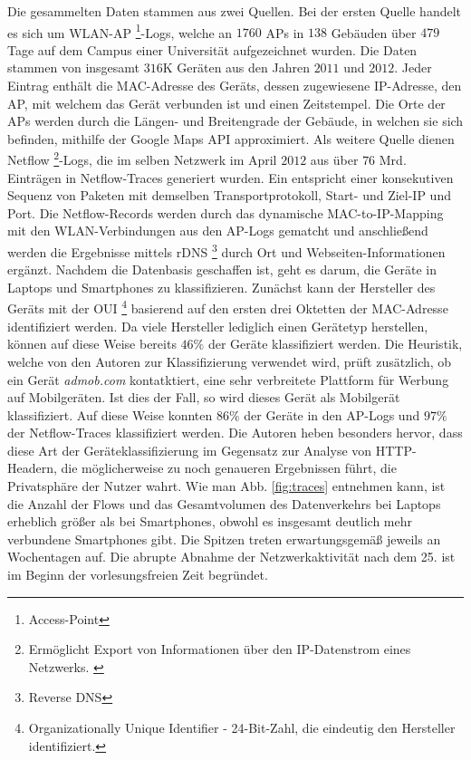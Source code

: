\documentclass[12pt, a4paper]{article}
\begin{document}
Die gesammelten Daten stammen aus zwei Quellen. Bei der ersten Quelle handelt es sich um WLAN-AP \footnote{Access-Point}-Logs,
welche an $1760$ APs in $138$ Gebäuden über $479$ Tage auf dem Campus einer Universität aufgezeichnet wurden. 
Die Daten stammen von insgesamt $316$\textsc{K} Geräten aus den Jahren $2011$ und $2012$. Jeder Eintrag enthält die 
MAC-Adresse des Geräts, dessen zugewiesene IP-Adresse, den AP, mit welchem das Gerät verbunden ist und einen Zeitstempel.
Die Orte der APs werden durch die Längen- und Breitengrade der Gebäude, in welchen sie sich befinden, mithilfe der Google Maps API
approximiert. Als weitere Quelle dienen Netflow \footnote{Ermöglicht Export von Informationen über den IP-Datenstrom eines 
Netzwerks. \cite{RFC3954}}-Logs, die im selben Netzwerk im April $2012$ aus über $76$ Mrd.
Einträgen in Netflow-Traces generiert wurden. Ein  entspricht einer konsekutiven Sequenz von Paketen
mit demselben Transportprotokoll, Start- und Ziel-IP und Port. \cite{Alipour2018}
Die Netflow-Records werden durch das dynamische MAC-to-IP-Mapping mit den WLAN-Verbindungen aus den AP-Logs gematcht
und anschließend werden die Ergebnisse mittels rDNS \footnote{Reverse DNS} durch Ort und Webseiten-Informationen
ergänzt. Nachdem die Datenbasis geschaffen ist, geht es darum, die Geräte in Laptops und Smartphones zu klassifizieren.
Zunächst kann der Hersteller des Geräts mit der OUI \footnote{Organizationally Unique Identifier - 24-Bit-Zahl, 
die eindeutig den Hersteller identifiziert.} basierend auf den ersten drei Oktetten der MAC-Adresse identifiziert werden.
Da viele Hersteller lediglich einen Gerätetyp herstellen, können auf diese Weise bereits
$46 \%$ der Geräte klassifiziert werden. Die Heuristik, welche von den Autoren zur Klassifizierung verwendet wird,
prüft zusätzlich, ob ein Gerät \textit{admob.com} kontatktiert, eine sehr verbreitete Plattform für Werbung auf Mobilgeräten.
Ist dies der Fall, so wird dieses Gerät als Mobilgerät klassifiziert. Auf diese Weise konnten $86 \%$ der Geräte in den AP-Logs
und $97 \%$ der Netflow-Traces klassifiziert werden. 
Die Autoren heben besonders hervor, dass diese Art der Geräteklassifizierung im Gegensatz zur Analyse von 
HTTP-Headern, die möglicherweise zu noch genaueren Ergebnissen führt, die Privatsphäre der Nutzer wahrt.\newline
Wie man Abb. \ref{fig:traces} entnehmen kann, ist die Anzahl der Flows und das Gesamtvolumen des Datenverkehrs bei Laptops
erheblich größer als bei Smartphones, obwohl es insgesamt deutlich mehr verbundene Smartphones gibt. 
Die Spitzen treten erwartungsgemäß jeweils an Wochentagen auf. 
Die abrupte Abnahme der Netzwerkaktivität nach dem 25. ist im Beginn der vorlesungsfreien Zeit begründet.
\end{document}
